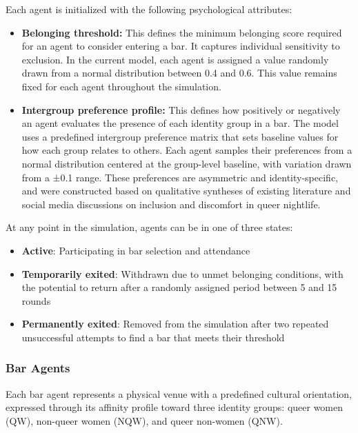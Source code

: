 \documentclass{article}
\begin{document}
Each agent is initialized with the following psychological attributes:

\begin{itemize}
    \item \textbf{Belonging threshold:} This defines the minimum belonging score required for an agent to consider entering a bar. It captures individual sensitivity to exclusion. In the current model, each agent is assigned a value randomly drawn from a normal distribution between 0.4 and 0.6. This value remains fixed for each agent throughout the simulation.
    \item \textbf{Intergroup preference profile:} This defines how positively or negatively an agent evaluates the presence of each identity group in a bar. The model uses a predefined intergroup preference matrix that sets baseline values for how each group relates to others. Each agent samples their preferences from a normal distribution centered at the group-level baseline, with variation drawn from a ±0.1 range. These preferences are asymmetric and identity-specific, and were constructed based on qualitative syntheses of existing literature and social media discussions on inclusion and discomfort in queer nightlife.
\end{itemize}

At any point in the simulation, agents can be in one of three states:
\begin{itemize}
    \item \textbf{Active}: Participating in bar selection and attendance
    \item \textbf{Temporarily exited}: Withdrawn due to unmet belonging conditions, with the potential to return after a randomly assigned period between 5 and 15 rounds
    \item \textbf{Permanently exited}: Removed from the simulation after two repeated unsuccessful attempts to find a bar that meets their threshold
    
\end{itemize}

\subsubsection{Bar Agents}

Each bar agent represents a physical venue with a predefined cultural orientation, expressed through its affinity profile toward three identity groups: queer women (QW), non-queer women (NQW), and queer non-women (QNW).
\end{document}
